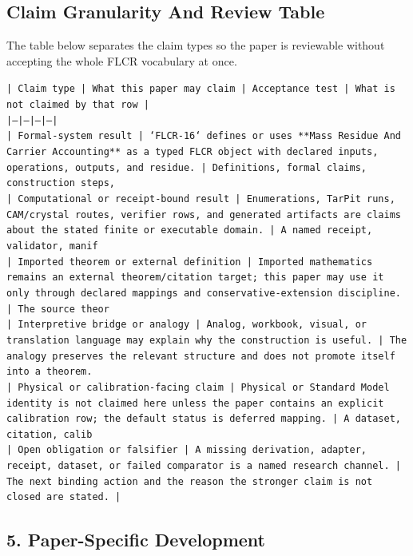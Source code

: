 \documentclass[11pt]{article}
\begin{document}
\subsection*{Claim Granularity And Review Table}

The table below separates the claim types so the paper is reviewable without accepting the whole FLCR vocabulary at once.

\noindent\texttt{| Claim type | What this paper may claim | Acceptance test | What is not claimed by that row |}\\
\noindent\texttt{|---|---|---|---|}\\
\noindent\texttt{| Formal-system result | `FLCR-16` defines or uses **Mass Residue And Carrier Accounting** as a typed FLCR object with declared inputs, operations, outputs, and residue. | Definitions, formal claims, construction steps, }\\
\noindent\texttt{| Computational or receipt-bound result | Enumerations, TarPit runs, CAM/crystal routes, verifier rows, and generated artifacts are claims about the stated finite or executable domain. | A named receipt, validator, manif}\\
\noindent\texttt{| Imported theorem or external definition | Imported mathematics remains an external theorem/citation target; this paper may use it only through declared mappings and conservative-extension discipline. | The source theor}\\
\noindent\texttt{| Interpretive bridge or analogy | Analog, workbook, visual, or translation language may explain why the construction is useful. | The analogy preserves the relevant structure and does not promote itself into a theorem. }\\
\noindent\texttt{| Physical or calibration-facing claim | Physical or Standard Model identity is not claimed here unless the paper contains an explicit calibration row; the default status is deferred mapping. | A dataset, citation, calib}\\
\noindent\texttt{| Open obligation or falsifier | A missing derivation, adapter, receipt, dataset, or failed comparator is a named research channel. | The next binding action and the reason the stronger claim is not closed are stated. | }\\

\subsection*{5. Paper-Specific Development}
\end{document}

